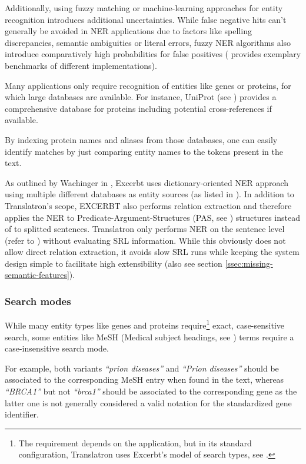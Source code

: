 \documentclass[a4paper, 12pt, twoside, reqn]{report}
\numberwithin{figure}{chapter}
\newtheorem[L]{boxedDefinition}{Definition}
\newtheorem[L]{boxedExample}{Example}
\newcommand{\itquote}[1]{\textit{{``}#1{''}}}
\begin{document}
Additionally, using fuzzy matching or machine-learning approaches for entity recognition introduces additional uncertainties. While false negative hits can't generally be avoided in NER applications due to factors like spelling discrepancies, semantic ambiguities or literal errors, fuzzy NER algorithms also introduce comparatively high probabilities for false positives (\cite{leaman2008banner} provides exemplary benchmarks of different implementations).

Many applications only require recognition of entities like genes or proteins, for which large databases are available. For instance, UniProt (see \cite{uniprot2008universal}) provides a comprehensive database for proteins including potential cross-references if available.

By indexing protein names and aliases from those databases, one can easily identify matches by just comparing entity names to the  tokens present in the text.

As outlined by Wachinger in \cite[section 4.3]{wachinger2013next}, Excerbt uses dictionary-oriented NER approach using multiple different databases as entity sources (as listed in \cite[table 4.3]{wachinger2013next}). In addition to Translatron's scope, EXCERBT also performs relation extraction and therefore applies the NER to Predicate-Argument-Structures (PAS, see \cite[section 2.5.4]{wachinger2013next}) structures instead of to splitted sentences. Translatron only performs NER on the sentence level (refer to \cite[figure 4.5]{wachinger2013next}) without evaluating SRL information. While this obviously does not allow direct relation extraction, it avoids slow SRL runs while keeping the system design simple to facilitate high extensibility (also see section \ref{ssec:missing-semantic-features}).

\subsubsection{Search modes}
\label{sssec:nersearchmodes}

While many entity types like genes and proteins require\footnote{The requirement depends on the application, but in its standard configuration, Translatron uses Excerbt's model of search types, see \cite[section 4.5, table 4.1]{wachinger2013next}.} exact, case-sensitive search, some entities like MeSH (Medical subject headings, see \cite{lipscomb2000medical}) terms require a case-insensitive search mode.

For example, both variants \itquote{prion diseases} and \itquote{Prion diseases} should be associated to the corresponding MeSH entry when found in the text, whereas \itquote{BRCA1} but not \itquote{brca1} should be associated to the corresponding gene as the latter one is not generally considered a valid notation for the standardized gene identifier.
\end{document}
